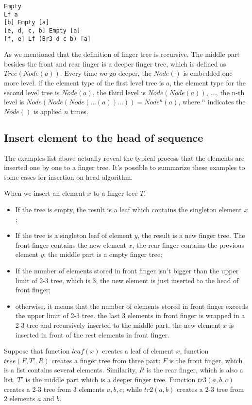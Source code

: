 \documentclass[UTF8]{article}
\begin{document}
\lstset{language=Haskell}
\begin{lstlisting}
Empty
Lf a
[b] Empty [a]
[e, d, c, b] Empty [a]
[f, e] Lf (Br3 d c b) [a]
\end{lstlisting}

As we mentioned that the definition of finger tree is recursive.
The middle part besides the front and rear finger is a deeper finger tree,
which is defined as $Tree(Node(a))$. Every time we go deeper, the
$Node()$ is embedded one more level. if the element type of the first level tree
is $a$, the element type for the second level tree is $Node(a)$,
the third level is $Node(Node(a))$, ..., the n-th level is
$Node(Node(Node(...(a))...)) = Node^n(a)$, where $^n$ indicates the $Node()$
is applied $n$ times.

\subsection{Insert element to the head of sequence}

The examples list above actually reveal the typical process that the
elements are inserted one by one to a finger tree. It's possible to summarize
these examples to some cases for insertion on head algorithm.

When we insert an element $x$ to a finger tree $T$,
\begin{itemize}
\item If the tree is empty, the result is a leaf which contains the singleton element $x$;
\item If the tree is a singleton leaf of element $y$, the result is a new finger tree. The front finger contains the new element $x$, the rear finger contains the previous element $y$; the middle part is a empty finger tree;
\item If the number of elements stored in front finger isn't bigger than the upper limit of 2-3 tree, which is 3, the new element is just inserted to the head
of front finger;
\item otherwise, it means that the number of elements stored in front finger exceeds the upper limit of 2-3 tree. the last 3 elements in front finger is wrapped in a 2-3 tree and recursively inserted to the middle part. the new element $x$ is inserted in front of the rest elements in front finger.
\end{itemize}

Suppose that function $leaf(x)$ creates a leaf of element $x$, function
$tree(F, T', R)$ creates a finger tree from three part: $F$ is the front
finger, which is a list contains several elements. Similarity, $R$ is the
rear finger, which is also a list. $T'$ is the middle part which is a
deeper finger tree. Function $tr3(a, b, c)$ creates a 2-3 tree from 3
elements $a, b, c$; while $tr2(a, b)$ creates a 2-3 tree from 2 elements
$a$ and $b$.
\end{document}
